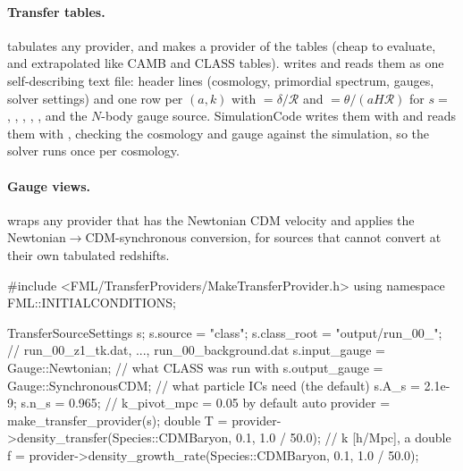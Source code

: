 \paragraph*{Transfer tables.}  tabulates any
provider, and  makes a provider of the tables (cheap to evaluate, and extrapolated like
CAMB and CLASS tables).  writes and reads them as one self-describing text file:  header lines (cosmology, primordial spectrum, gauges, solver settings) and one row per $(a,k)$ with
 $=\delta/\mathcal R$ and  $=\theta/(aH\mathcal R)$ for $s=$ , , ,
, , and the $N$-body gauge source. SimulationCode writes them with
 and reads them with , checking
the cosmology and gauge against the simulation, so the solver runs once per cosmology.

\paragraph*{Gauge views.}  wraps any provider that has the Newtonian CDM velocity and applies the
Newtonian$\to$CDM-synchronous conversion, for sources that cannot convert at their own tabulated redshifts.

\begin{cppcode}
#include <FML/TransferProviders/MakeTransferProvider.h>
using namespace FML::INITIALCONDITIONS;

TransferSourceSettings s;
s.source       = "class";
s.class_root   = "output/run_00_";        // run_00_z1_tk.dat, ..., run_00_background.dat
s.input_gauge  = Gauge::Newtonian;        // what CLASS was run with
s.output_gauge = Gauge::SynchronousCDM;   // what particle ICs need (the default)
s.A_s = 2.1e-9; s.n_s = 0.965;            // k_pivot_mpc = 0.05 by default
auto provider = make_transfer_provider(s);
double T = provider->density_transfer(Species::CDMBaryon, 0.1, 1.0 / 50.0);     // k [h/Mpc], a
double f = provider->density_growth_rate(Species::CDMBaryon, 0.1, 1.0 / 50.0);
\end{cppcode}

